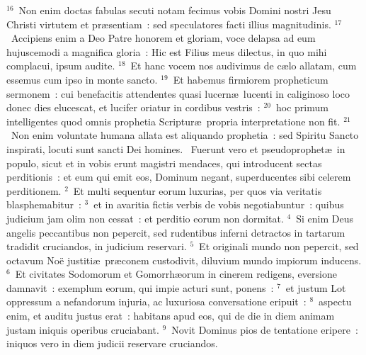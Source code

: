${}^{16}$~Non enim doctas fabulas secuti notam fecimus vobis Domini nostri Jesu Christi virtutem et pr\ae sentiam~: sed speculatores facti illius magnitudinis.
${}^{17}$~Accipiens enim a Deo Patre honorem et gloriam, voce delapsa ad eum hujuscemodi a magnifica gloria~: Hic est Filius meus dilectus, in quo mihi complacui, ipsum audite.
${}^{18}$~Et hanc vocem nos audivimus de c\ae lo allatam, cum essemus cum ipso in monte sancto.
${}^{19}$~Et habemus firmiorem propheticum sermonem~: cui benefacitis attendentes quasi lucern\ae\ lucenti in caliginoso loco donec dies elucescat, et lucifer oriatur in cordibus vestris~:
${}^{20}$~hoc primum intelligentes quod omnis prophetia Scriptur\ae\ propria interpretatione non fit.
${}^{21}$~Non enim voluntate humana allata est aliquando prophetia~: sed Spiritu Sancto inspirati, locuti sunt sancti Dei homines.
~\lettrine[lines=10,image=true,loversize=0.05,lraise=-0.03]{F}{}uerunt vero et pseudoprophet\ae\ in populo, sicut et in vobis erunt magistri mendaces, qui introducent sectas perditionis~: et eum qui emit eos, Dominum negant, superducentes sibi celerem perditionem.
${}^{2}$~Et multi sequentur eorum luxurias, per quos via veritatis blasphemabitur~:
${}^{3}$~et in avaritia fictis verbis de vobis negotiabuntur~: quibus judicium jam olim non cessat~: et perditio eorum non dormitat.
${}^{4}$~Si enim Deus angelis peccantibus non pepercit, sed rudentibus inferni detractos in tartarum tradidit cruciandos, in judicium reservari.
${}^{5}$~Et originali mundo non pepercit, sed octavum No\"e justiti\ae\ pr\ae conem custodivit, diluvium mundo impiorum inducens.
${}^{6}$~Et civitates Sodomorum et Gomorrh\ae orum in cinerem redigens, eversione damnavit~: exemplum eorum, qui impie acturi sunt, ponens~:
${}^{7}$~et justum Lot oppressum a nefandorum injuria, ac luxuriosa conversatione eripuit~:
${}^{8}$~aspectu enim, et auditu justus erat~: habitans apud eos, qui de die in diem animam justam iniquis operibus cruciabant.
${}^{9}$~Novit Dominus pios de tentatione eripere~: iniquos vero in diem judicii reservare cruciandos.


